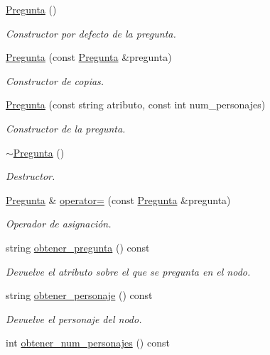 \begin{DoxyCompactItemize}
\item 
\hyperlink{classPregunta_aaac7bf3895f4b9259c870136a137b679}{Pregunta} ()
\begin{DoxyCompactList}\small\item\em Constructor por defecto de la pregunta. \end{DoxyCompactList}\item 
\hyperlink{classPregunta_a3f8660ca02e487029ab509fd85542d9b}{Pregunta} (const \hyperlink{classPregunta}{Pregunta} \&pregunta)
\begin{DoxyCompactList}\small\item\em Constructor de copias. \end{DoxyCompactList}\item 
\hyperlink{classPregunta_a0d66edc0f1495dbddafcee131663e00c}{Pregunta} (const string atributo, const int num\+\_\+personajes)
\begin{DoxyCompactList}\small\item\em Constructor de la pregunta. \end{DoxyCompactList}\item 
\hyperlink{classPregunta_a644894e8c4158aebd9e4ce443c59a0e4}{$\sim$\+Pregunta} ()
\begin{DoxyCompactList}\small\item\em Destructor. \end{DoxyCompactList}\item 
\hyperlink{classPregunta}{Pregunta} \& \hyperlink{classPregunta_a37ef936f286e9fb87f57a985b5da9743}{operator=} (const \hyperlink{classPregunta}{Pregunta} \&pregunta)
\begin{DoxyCompactList}\small\item\em Operador de asignación. \end{DoxyCompactList}\item 
string \hyperlink{classPregunta_a5fd2728f30ac0e0716bac24d25b67b87}{obtener\+\_\+pregunta} () const 
\begin{DoxyCompactList}\small\item\em Devuelve el atributo sobre el que se pregunta en el nodo. \end{DoxyCompactList}\item 
string \hyperlink{classPregunta_acb40ed548f61ea961765fd82df23c8de}{obtener\+\_\+personaje} () const 
\begin{DoxyCompactList}\small\item\em Devuelve el personaje del nodo. \end{DoxyCompactList}\item 
int \hyperlink{classPregunta_a172316625f4f451d5ddd3392aba8b348}{obtener\+\_\+num\+\_\+personajes} () const \hypertarget{classPregunta_a172316625f4f451d5ddd3392aba8b348}{}\label{classPregunta_a172316625f4f451d5ddd3392aba8b348}


\end{DoxyCompactItemize}
